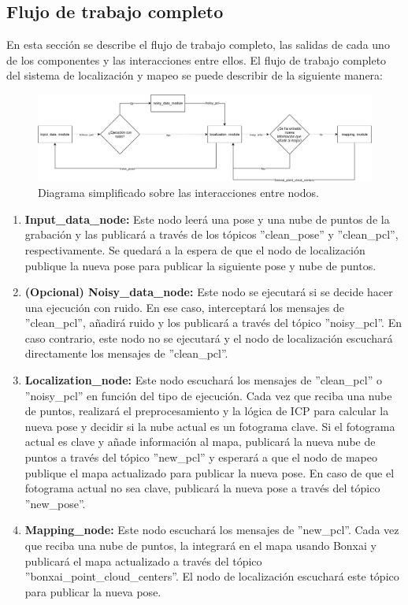 \documentclass[12pt, a4paper, twoside]{article}
\begin{document}
\subsection{Flujo de trabajo completo}
En esta sección se describe el flujo de trabajo completo, las salidas de cada uno de los componentes y las interacciones entre ellos. El flujo de trabajo completo del sistema de localización 
y mapeo se puede describir de la siguiente manera:
\begin{figure}[h]
  \includegraphics[width=1\textwidth]{Diagrama.png}
  \caption{Diagrama simplificado sobre las interacciones entre nodos.}
\end{figure}
\begin{enumerate}
  \item \textbf{Input\_data\_node:} Este nodo leerá una pose y una nube de puntos de la grabación y las publicará a través de los tópicos 
  ''clean\_pose'' y ''clean\_pcl'', respectivamente. Se quedará a la espera de que el nodo de localización publique la nueva pose para publicar 
  la siguiente pose y nube de puntos.
  \item \textbf{(Opcional) Noisy\_data\_node:} 
  Este nodo se ejecutará si se decide hacer una ejecución con ruido. En ese caso, interceptará los mensajes de ''clean\_pcl'', añadirá ruido y los publicará a través del tópico
  ''noisy\_pcl''. En caso contrario, este nodo no se ejecutará y el nodo de localización escuchará directamente los mensajes de ''clean\_pcl''.
  \item \textbf{Localization\_node:} Este nodo escuchará los mensajes de ''clean\_pcl'' o ''noisy\_pcl'' en función del tipo de ejecución. Cada vez que reciba una nube de puntos, 
  realizará el preprocesamiento y la lógica de ICP para calcular la nueva pose y decidir si la nube actual es un fotograma clave. Si el fotograma actual es clave y añade información 
  al mapa, publicará la nueva nube de puntos a través del tópico ''new\_pcl'' y esperará a que el nodo de mapeo publique el mapa actualizado para publicar la nueva pose.
  En caso de que el fotograma actual no sea clave, publicará la nueva pose a través del tópico ''new\_pose''.
  \item \textbf{Mapping\_node:} Este nodo escuchará los mensajes de ''new\_pcl''. Cada vez que reciba una nube de puntos, la integrará en el mapa usando Bonxai\cite{faconti2024bonxai} y publicará el mapa actualizado a través del tópico
  ''bonxai\_point\_cloud\_centers''. El nodo de localización escuchará este tópico para publicar la nueva pose.
\end{enumerate}
\end{document}
